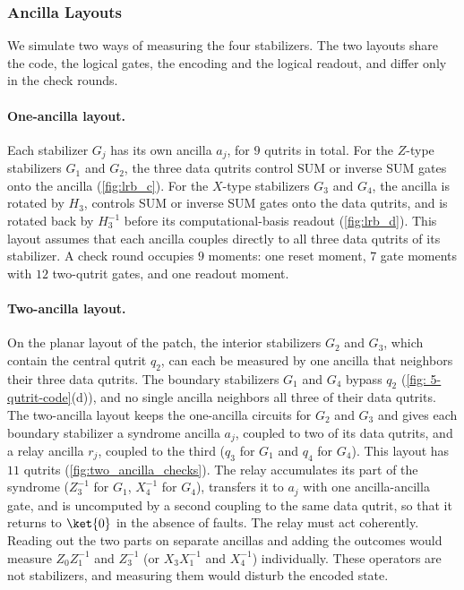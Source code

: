 \subsubsection{Ancilla Layouts}
\label{sub:ancilla_layouts}

We simulate two ways of measuring the four stabilizers. The two layouts share the code, the logical gates, the encoding and the logical readout, and differ only in the check rounds.

\paragraph{One-ancilla layout.} Each stabilizer $G_j$ has its own ancilla $a_j$, for $9$ qutrits in total. For the $Z$-type stabilizers $G_1$ and $G_2$, the three data qutrits control SUM or inverse SUM gates onto the ancilla (\autoref{fig:lrb_c}). For the $X$-type stabilizers $G_3$ and $G_4$, the ancilla is rotated by $H_3$, controls SUM or inverse SUM gates onto the data qutrits, and is rotated back by $H_3^{-1}$ before its computational-basis readout (\autoref{fig:lrb_d}). This layout assumes that each ancilla couples directly to all three data qutrits of its stabilizer. A check round occupies $9$ moments: one reset moment, $7$ gate moments with $12$ two-qutrit gates, and one readout moment.

\paragraph{Two-ancilla layout.} On the planar layout of the patch, the interior stabilizers $G_2$ and $G_3$, which contain the central qutrit $q_2$, can each be measured by one ancilla that neighbors their three data qutrits. The boundary stabilizers $G_1$ and $G_4$ bypass $q_2$ (\autoref{fig: 5-qutrit-code}(d)), and no single ancilla neighbors all three of their data qutrits. The two-ancilla layout keeps the one-ancilla circuits for $G_2$ and $G_3$ and gives each boundary stabilizer a syndrome ancilla $a_j$, coupled to two of its data qutrits, and a relay ancilla $r_j$, coupled to the third ($q_3$ for $G_1$ and $q_4$ for $G_4$). This layout has $11$ qutrits (\autoref{fig:two_ancilla_checks}). The relay accumulates its part of the syndrome ($Z_3^{-1}$ for $G_1$, $X_4^{-1}$ for $G_4$), transfers it to $a_j$ with one ancilla-ancilla gate, and is uncomputed by a second coupling to the same data qutrit, so that it returns to $\ket{0}$ in the absence of faults. The relay must act coherently. Reading out the two parts on separate ancillas and adding the outcomes would measure $Z_0 Z_1^{-1}$ and $Z_3^{-1}$ (or $X_3 X_1^{-1}$ and $X_4^{-1}$) individually. These operators are not stabilizers, and measuring them would disturb the encoded state.

